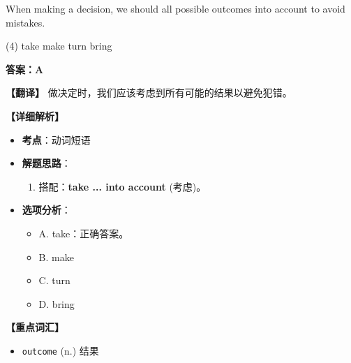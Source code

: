 \documentclass[11pt, a4paper]{article}
\newcommand{\analysis}[4]{
    \begin{solutionbox}
        \textbf{答案：#1}
        
        \textbf{【翻译】} #2
        
        \textbf{【详细解析】}
        #3
        
        \textbf{【重点词汇】}
        #4
    \end{solutionbox}
}
\newcommand{\blank}{\underline{\hspace{1.5cm}}}
\begin{document}
\begin{questions}
    \item When making a decision, we should \blank all possible outcomes into account to avoid mistakes.
    \begin{tasks}(4)
        \task take \task make \task turn \task bring
    \end{tasks}
    \analysis{A}{做决定时，我们应该考虑到所有可能的结果以避免犯错。}{
        \begin{itemize}
            \item \textbf{考点}：动词短语
            \item \textbf{解题思路}：
                \begin{enumerate}
                    \item 搭配：\textbf{take ... into account} (考虑)。
                \end{enumerate}
            \item \textbf{选项分析}：
                \begin{itemize}
                    \item A. take：正确答案。
                    \item B. make
                    \item C. turn
                    \item D. bring
                \end{itemize}
        \end{itemize}
    }{
        \begin{itemize}
            \item \texttt{outcome} (n.) 结果
        \end{itemize}
    }


\end{questions}
\end{document}
